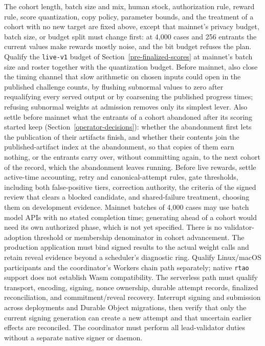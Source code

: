 The cohort length, batch size and mix, human stock, authorization rule, reward
rule, score quantization, copy policy, parameter bounds, and the treatment of a
cohort with no new target are fixed above, except that mainnet's privacy
budget, batch size, or budget split must change first: at 4,000 cases and 256
entrants the current values make rewards mostly noise, and the bit budget
refuses the plan. Qualify the \texttt{live-v1} budget of
Section~\ref{pre-finalized-scores} at mainnet's batch size and roster together
with the quantization budget. Before mainnet,
also close the timing channel that slow arithmetic on chosen inputs could open
in the published challenge counts, by flushing subnormal values to zero after
requalifying every served output or by coarsening the published progress
times; refusing subnormal weights at admission removes only its simplest
lever. Also settle before mainnet what the entrants of a cohort abandoned after
its scoring started keep (Section~\ref{operator-decisions}): whether the
abandonment first lets the publication of their artifacts finish, and whether
their contents join the published-artifact index at the abandonment, so that
copies of them earn nothing, or the entrants carry over, without committing
again, to the next cohort of the record, which the abandonment leaves running.
Before live rewards, settle active-time accounting,
retry and canonical-attempt rules, gate thresholds, including both
false-positive tiers, correction authority, the criteria of the signed review
that clears a blocked candidate, and shared-failure treatment, choosing them on
development evidence. Mainnet batches of 4,000 cases may use batch model APIs
with no stated completion time; generating ahead of a cohort would need its own
authorized phase, which is not yet specified. There is no validator-adoption
threshold or membership denominator in cohort advancement.
The production application must bind signed results to the actual weight calls
and retain reveal evidence beyond a scheduler's diagnostic ring. Qualify
Linux/macOS participants and the coordinator's Workers chain path separately;
native \texttt{rtao} support does not establish Wasm compatibility. The serverless
path must qualify transport, encoding, signing, nonce ownership, durable attempt
records, finalized reconciliation, and commitment/reveal recovery. Interrupt
signing and submission across deployments and Durable Object migrations, then
verify that only the current signing generation can create a new attempt and
that uncertain earlier effects are reconciled. The coordinator must perform
all lead-validator duties without a separate native signer or daemon.

